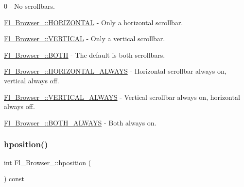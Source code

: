 \begin{DoxyItemize}
\item 0 -\/ No scrollbars.
\item \hyperlink{class_fl___browser___ae31c28a4c79819d686805fdd1e48698ea18547ff3d0f33220ebae43d040f82850}{Fl\+\_\+\+Browser\+\_\+\+::\+H\+O\+R\+I\+Z\+O\+N\+T\+AL} -\/ Only a horizontal scrollbar.
\item \hyperlink{class_fl___browser___ae31c28a4c79819d686805fdd1e48698ea7bb46232e38930bcac3bd67c96cdaff5}{Fl\+\_\+\+Browser\+\_\+\+::\+V\+E\+R\+T\+I\+C\+AL} -\/ Only a vertical scrollbar.
\item \hyperlink{class_fl___browser___ae31c28a4c79819d686805fdd1e48698eaab8e1ce95f30ab95086a09f50fc9e7b6}{Fl\+\_\+\+Browser\+\_\+\+::\+B\+O\+TH} -\/ The default is both scrollbars.
\item \hyperlink{class_fl___browser___ae31c28a4c79819d686805fdd1e48698ea565affd547be9e7d8d66ab078c2f32cf}{Fl\+\_\+\+Browser\+\_\+\+::\+H\+O\+R\+I\+Z\+O\+N\+T\+A\+L\+\_\+\+A\+L\+W\+A\+YS} -\/ Horizontal scrollbar always on, vertical always off.
\item \hyperlink{class_fl___browser___ae31c28a4c79819d686805fdd1e48698ea0b766422c7c7e00c660f9685d0b167e9}{Fl\+\_\+\+Browser\+\_\+\+::\+V\+E\+R\+T\+I\+C\+A\+L\+\_\+\+A\+L\+W\+A\+YS} -\/ Vertical scrollbar always on, horizontal always off.
\item \hyperlink{class_fl___browser___ae31c28a4c79819d686805fdd1e48698ea4af943b52ba7852580445055aaec0efc}{Fl\+\_\+\+Browser\+\_\+\+::\+B\+O\+T\+H\+\_\+\+A\+L\+W\+A\+YS} -\/ Both always on. 
\end{DoxyItemize}\mbox{\label{class_fl___browser___ae312c07fc6eee01f42eae60c85594889}} 
\subsubsection{\texorpdfstring{hposition()}{hposition()}\hspace{0.1cm}{\footnotesize\ttfamily [1/2]}}
{\footnotesize\ttfamily int Fl\+\_\+\+Browser\+\_\+\+::hposition (\begin{DoxyParamCaption}{ }\end{DoxyParamCaption}) const\hspace{0.3cm}{\ttfamily [inline]}}

